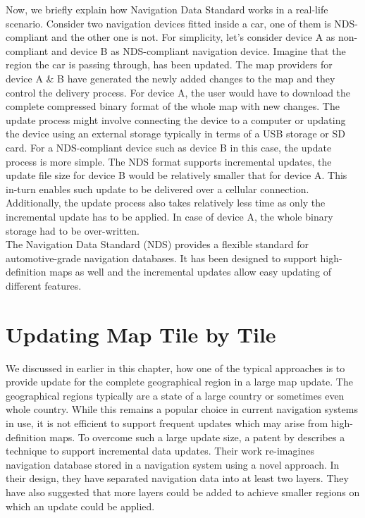 Now, we briefly explain how Navigation Data Standard works in a real-life scenario. Consider two navigation devices fitted inside a car, one of them is NDS-compliant and the other one is not. For simplicity, let's consider device A as non-compliant and device B as NDS-compliant navigation device. Imagine that the region the car is passing through, has been updated. The map providers for device A \& B have generated the newly added changes to the map and they control the delivery process. For device A, the user would have to download the complete compressed binary format of the whole map with new changes. The update process might involve connecting the device to a computer or updating the device using an external storage typically in terms of a USB storage or SD card. For a NDS-compliant device such as device B in this case, the update process is more simple. The NDS format supports incremental updates, the update file size for device B would be relatively smaller that for device A. This in-turn enables such update to be delivered over a cellular connection. Additionally, the update process also takes relatively less time as only the incremental update has to be applied. In case of device A, the whole binary storage had to be over-written. \\

The Navigation Data Standard (NDS) provides a flexible standard for automotive-grade navigation databases. It has been designed to support high-definition maps as well and the incremental updates allow easy updating of different features. 

\section{Updating Map Tile by Tile}
We discussed in earlier in this chapter, how one of the typical approaches is to provide update for the complete geographical region in a large map update. The geographical regions typically are a state of a large country or sometimes even whole country. While this remains a popular choice in current navigation systems in use, it is not efficient to support frequent updates which may arise from high-definition maps. To overcome such a large update size, a patent by \citet{fischer2012technique} describes a technique to support incremental data updates. Their work re-imagines navigation database stored in a navigation system using a novel approach. In their design, they have separated navigation data into at least two layers. They have also suggested that more layers could be added to achieve smaller regions on which an update could be applied. \\


